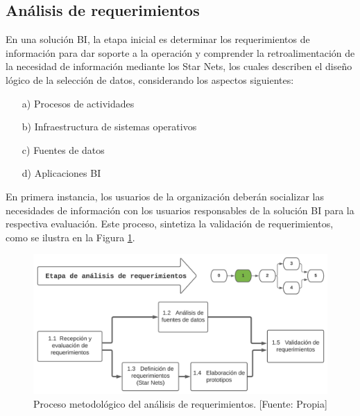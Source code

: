 \documentclass[11pt,titlepage]{report}
\begin{document}
\subsection{Análisis de requerimientos} 
En una solución BI, la etapa inicial es determinar los requerimientos de información para dar soporte a la operación y comprender la retroalimentación de la necesidad de información mediante los Star Nets, los cuales describen el diseño lógico de la selección de datos, considerando los aspectos siguientes:
\begin{multicols}{2}
\begin{itemize}
\item[a)] Procesos de actividades
\item[b)] Infraestructura de sistemas operativos
\item[c)] Fuentes de datos
\item[d)] Aplicaciones BI
\end{itemize}
\end{multicols}	

En primera instancia, los usuarios de la organización deberán socializar las necesidades de información con los usuarios responsables de la solución BI para la respectiva evaluación. Este proceso, sintetiza la validación de requerimientos, como se ilustra en la Figura \ref{fig: etapa0}.

\begin{figure}[h]
	\centering
	\includegraphics[width=1\linewidth]{Figuras/etapa1}
	\caption{Proceso metodológico del análisis de requerimientos. [Fuente: Propia]}
	\label{fig: etapa0}
\end{figure}
\end{document}
